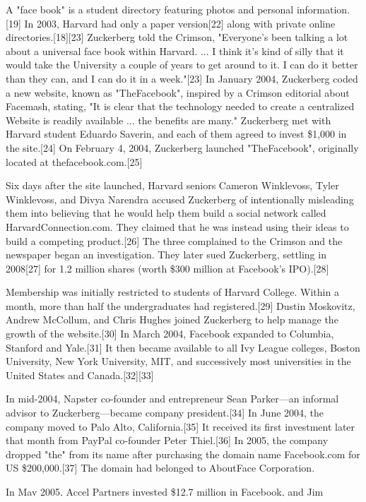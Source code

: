 \documentclass[12pt]{article}
\begin{document}
A "face book" is a student directory featuring photos and personal information.[19] In 2003, Harvard had only a paper version[22] along with private online directories.[18][23] Zuckerberg told the Crimson, "Everyone's been talking a lot about a universal face book within Harvard. ... I think it's kind of silly that it would take the University a couple of years to get around to it. I can do it better than they can, and I can do it in a week."[23] In January 2004, Zuckerberg coded a new website, known as "TheFacebook", inspired by a Crimson editorial about Facemash, stating, "It is clear that the technology needed to create a centralized Website is readily available ... the benefits are many." Zuckerberg met with Harvard student Eduardo Saverin, and each of them agreed to invest \$1,000 in the site.[24] On February 4, 2004, Zuckerberg launched "TheFacebook", originally located at thefacebook.com.[25]

Six days after the site launched, Harvard seniors Cameron Winklevoss, Tyler Winklevoss, and Divya Narendra accused Zuckerberg of intentionally misleading them into believing that he would help them build a social network called HarvardConnection.com. They claimed that he was instead using their ideas to build a competing product.[26] The three complained to the Crimson and the newspaper began an investigation. They later sued Zuckerberg, settling in 2008[27] for 1.2 million shares (worth \$300 million at Facebook's IPO).[28]

Membership was initially restricted to students of Harvard College. Within a month, more than half the undergraduates had registered.[29] Dustin Moskovitz, Andrew McCollum, and Chris Hughes joined Zuckerberg to help manage the growth of the website.[30] In March 2004, Facebook expanded to Columbia, Stanford and Yale.[31] It then became available to all Ivy League colleges, Boston University, New York University, MIT, and successively most universities in the United States and Canada.[32][33]

In mid-2004, Napster co-founder and entrepreneur Sean Parker—an informal advisor to Zuckerberg—became company president.[34] In June 2004, the company moved to Palo Alto, California.[35] It received its first investment later that month from PayPal co-founder Peter Thiel.[36] In 2005, the company dropped "the" from its name after purchasing the domain name Facebook.com for US \$200,000.[37] The domain had belonged to AboutFace Corporation. 




In May 2005, Accel Partners invested \$12.7 million in Facebook, and Jim Breyer[38] added \$1 million of his own money. A high-school version of the site launched in September 2005.[39] Eligibility expanded to include employees of several companies, including Apple Inc. and Microsoft.[40]
\end{document}
